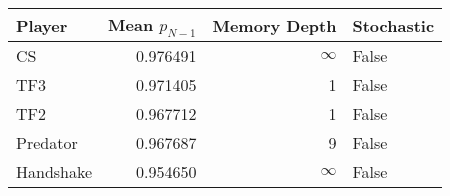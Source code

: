 \begin{tabular}{lrrl}
\toprule
    Player &  Mean $p_{N-1}$ &  Memory Depth & Stochastic \\
\midrule
        CS &        0.976491 &            \(\infty\) &      False \\
       TF3 &        0.971405 &             1 &      False \\
       TF2 &        0.967712 &             1 &      False \\
  Predator &        0.967687 &             9 &      False \\
 Handshake &        0.954650 &            \(\infty\) &      False \\
\bottomrule
\end{tabular}
